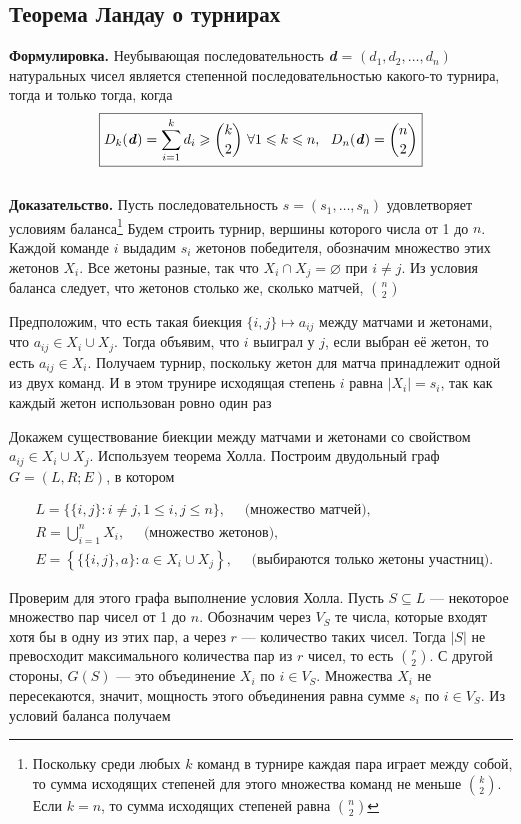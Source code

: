 \documentclass[a4paper]{article}
\begin{document}
\subsection{Теорема Ландау о турнирах}
\textbf{Формулировка.} Неубывающая последовательность \textbf{\textit{d}} = $(d_1,d_2,\ldots,d_n)$ натуральных чисел является степенной 
последовательностью какого-то турнира, тогда и только тогда, когда 
$$\boxed{D_k(\textbf{\textit{d}})=\sum_{i=1}^k d_i\geqslant\dbinom{k}{2}\ \forall 1\leqslant k \leqslant n,\ \ D_n(\textbf{\textit{d}})=\dbinom{n}{2}}$$\\[2mm]
\indent\textbf{Доказательство.} Пусть последовательность $s=\left(s_{1}, \ldots, s_{n}\right)$ удовлетворяет условиям баланса\footnote[1]{Поскольку среди 
любых $k$ команд в турнире каждая пара играет между собой, то сумма исходящих степеней для этого множества команд не меньше 
$\binom{k}{2}$. Если $k=n$, то сумма исходящих степеней равна $\binom{n}{2}$} 
Будем строить турнир, вершины которого числа от 1 до $n$. Каждой команде $i$ выдадим $s_{i}$ жетонов победителя, обозначим множество этих 
жетонов $X_{i}$. Все жетоны разные, так что $X_{i} \cap X_{j}=\varnothing$ при $i \neq j$. Из условия баланса следует, что жетонов столько же, 
сколько матчей, $\binom{n}{2}$

Предположим, что есть такая биекция $\{i, j\} \mapsto a_{i j}$ между матчами и 
жетонами, что $a_{i j} \in X_{i} \cup X_{j}$. Тогда объявим, что $i$ выиграл у $j$, если выбран её жетон, то есть $a_{i j} \in X_{i}$. 
Получаем турнир, поскольку жетон для матча принадлежит одной из двух команд. И в этом трунире исходящая степень $i$ равна $\left|X_{i}\right|=s_{i}$, 
так как каждый жетон использован ровно один раз

Докажем существование биекции между матчами и жетонами со свойством $a_{i j} \in X_{i} \cup X_{j}$. Используем теорема Холла. 
Построим двудольный граф $G=(L, R ; E)$, в котором

$$
\begin{aligned}
& L=\{\{i, j\}: i \neq j, 1 \leqslant i, j \leqslant n\}, \quad \text { (множество матчей)}, \\
& R=\bigcup_{i=1}^{n} X_{i}, \quad \text { (множество жетонов), } \\
& E=\left\{\{\{i, j\}, a\}: a \in X_{i} \cup X_{j}\right\}, \quad \text { (выбираются только жетоны участниц). }
\end{aligned}
$$

Проверим для этого графа выполнение условия Холла. Пусть $S \subseteq L$ — некоторое множество пар чисел от 1 до $n$. Обозначим через 
$V_{S}$ те числа, которые входят хотя бы в одну из этих пар, а через $r$ — количество таких чисел. Тогда $|S|$ не превосходит максимального 
количества пар из $r$ чисел, то есть $\binom{r}{2}$. С другой стороны, $G(S)$ — это объединение $X_{i}$ 
по $i \in V_{S}$. Множества $X_{i}$ не пересекаются, значит, мощность этого объединения равна сумме $s_{i}$ по $i \in V_{S}$. Из условий баланса получаем
\end{document}

